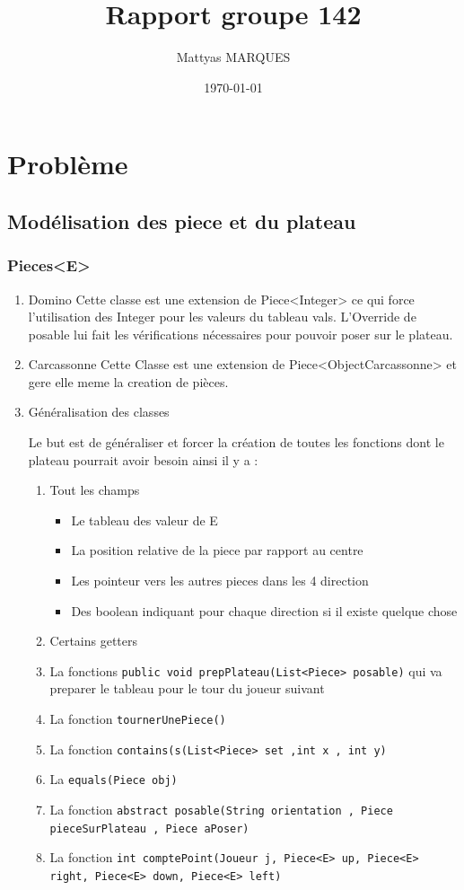 \documentclass[11pt]{article}
\author{Mattyas MARQUES}
\date{\today}
\title{Rapport groupe 142}
\begin{document}
\maketitle
\tableofcontents

\section{Problème}
\label{sec:org3295681}
\subsection{Modélisation des piece et du plateau}
\label{sec:org36ed440}
\subsubsection{Pieces<E>}
\label{sec:org88f7228}
\begin{enumerate}
\item Domino
\label{sec:org8ff8df6}
Cette classe est une extension de Piece<Integer> ce qui force l'utilisation des Integer pour les valeurs du tableau vals. L'Override de posable lui fait les vérifications nécessaires pour pouvoir poser sur le plateau. 
\item Carcassonne
\label{sec:org1a64977}
Cette Classe est une extension de Piece<ObjectCarcassonne> et gere elle meme la creation de pièces.
\item Généralisation des classes
\label{sec:org43697be}

Le but est de généraliser et forcer la création de toutes les fonctions dont le plateau pourrait avoir besoin ainsi il y a : 
\begin{enumerate}
\item Tout les champs
\begin{itemize}
\item Le tableau des valeur de E
\item La position relative de la piece par rapport au centre
\item Les pointeur vers les autres pieces dans les 4 direction
\item Des boolean indiquant pour chaque direction si il existe quelque chose
\end{itemize}
\item Certains getters
\item La fonctions \texttt{public void prepPlateau(List<Piece> posable)} qui va preparer le tableau pour le tour du joueur suivant
\item La fonction \texttt{tournerUnePiece()}
\item La fonction \texttt{contains(s(List<Piece> set ,int x , int y)}
\item La \texttt{equals(Piece obj)}
\item La fonction \texttt{abstract posable(String orientation , Piece pieceSurPlateau , Piece aPoser)}
\item La fonction \texttt{int comptePoint(Joueur j, Piece<E> up, Piece<E> right, Piece<E> down, Piece<E> left)}
\end{enumerate}
\end{enumerate}
\end{document}
